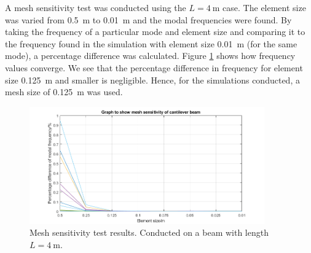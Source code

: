 A mesh sensitivity test was conducted using the $L=\SI{4}{\meter}$ case. The element size was varied from \SI{0.5}{\meter} to \SI{0.01}{\meter} and the modal frequencies were found. By taking the frequency of a particular mode and element size and comparing it to the frequency found in the simulation with element size \SI{0.01}{\meter} (for the same mode), a percentage difference was calculated. Figure \ref{mesh1} shows how frequency values converge. We see that the percentage difference in frequency for element size \SI{0.125}{\meter} and smaller is negligible. Hence, for the simulations conducted, a mesh size of \SI{0.125}{\meter} was used.
\begin{figure}[H]
    \centering
    \includegraphics[width = 0.9\textwidth]{img/fig4.png}
    \caption{Mesh sensitivity test results. Conducted on a beam with length $L=\SI{4}{\meter}$.}
    \label{mesh1}
\end{figure}
